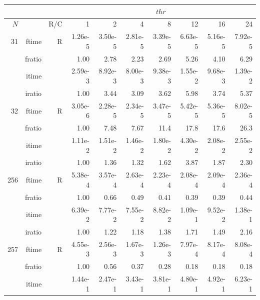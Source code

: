 \documentclass[a4paper]{article}
\begin{document}
\begin{table}[!htbp]
\begin{center}
\begin{small}
\begin{tabular}{|r|r|r|r|r|r|r|r|r|r|}
\hline 
     \multicolumn{3}{|c|}{ } & \multicolumn{7}{c|}{$thr$} \\ \hline
    $N$  & & R/C  & 1           & 2    & 4    & 8    & 12   & 16    & 24  \\ \hline\hline
    31  & ftime & R  &  1.26e-5 &   3.50e-5 &   2.81e-5 &   3.39e-5 &   6.63e-5 &   5.16e-5 &   7.92e-5   \\ 
      & fratio & &      1.00 &   2.78 &   2.23 &   2.69 &   5.26 &   4.10 &   6.29     \\ 
     & itime & &        2.59e-3 &   8.92e-3 &   8.00e-3 &   9.38e-3 &   1.55e-2 &   9.68e-3 &   1.39e-2     \\ 
     & iratio & &       1.00 &   3.44 &   3.09 &   3.62 &   5.98 &   3.74 &   5.37      \\ \hline 
    32  & ftime & R  &  3.05e-6 &   2.28e-5 &   2.34e-5 &   3.47e-5 &   5.42e-5 &   5.36e-5 &   8.02e-5   \\ 
      & fratio & &      1.00 &   7.48 &   7.67 &   11.4 &   17.8 &   17.6 &   26.3     \\ 
     & itime & &        1.11e-2 &   1.51e-2 &   1.46e-2 &   1.80e-2 &   4.30e-2 &   2.08e-2 &   2.55e-2     \\ 
     & iratio & &       1.00 &   1.36 &   1.32 &   1.62 &   3.87 &   1.87 &   2.30      \\ \hline 
   256  & ftime & R  &  5.38e-4 &   3.57e-4 &   2.63e-4 &   2.23e-4 &   2.08e-4 &   2.09e-4 &   2.36e-4   \\ 
      & fratio & &      1.00 &   0.66 &   0.49 &   0.41 &   0.39 &   0.39 &   0.44     \\ 
     & itime & &        6.39e-2 &   7.77e-2 &   7.55e-2 &   8.82e-2 &   1.09e-1 &   9.52e-2 &   1.38e-1     \\ 
     & iratio & &       1.00 &   1.22 &   1.18 &   1.38 &   1.71 &   1.49 &   2.16      \\ \hline 
   257  & ftime & R  &  4.55e-3 &   2.56e-3 &   1.67e-3 &   1.26e-3 &   7.97e-4 &   8.17e-4 &   8.08e-4   \\ 
      & fratio & &      1.00 &   0.56 &   0.37 &   0.28 &   0.18 &   0.18 &   0.18     \\ 
     & itime & &        1.44e-1 &   2.47e-1 &   3.43e-1 &   3.81e-1 &   4.80e-1 &   4.92e-1 &   6.23e-1     \\ 

\end{tabular}
\end{small}
\end{center}
\end{table}
\end{document}
